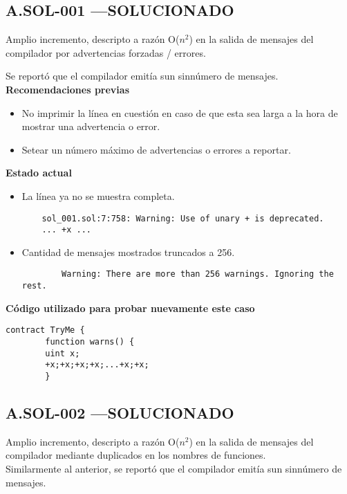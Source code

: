 \subsection*{A.SOL-001 \color{ForestGreen}—SOLUCIONADO}
Amplio incremento, descripto a razón O(${n^2}$) en la salida de mensajes del compilador por advertencias forzadas / errores.
\bigskip

Se reportó que el compilador emitía sun sinnúmero de mensajes.\\

\textbf{Recomendaciones previas}
\begin{itemize}
    \item No imprimir la línea en cuestión en caso de que esta sea larga a la hora de mostrar una advertencia o error.
    \item Setear un número máximo de advertencias o errores a reportar.
\end{itemize}
\bigskip

\textbf{Estado actual}
\begin{itemize}
    \item La línea ya no se muestra completa.
    \begin{lstlisting}
    sol_001.sol:7:758: Warning: Use of unary + is deprecated.
    ... +x ...
    \end{lstlisting}
    \item Cantidad de mensajes mostrados truncados a 256.
    \begin{lstlisting}
        Warning: There are more than 256 warnings. Ignoring the rest.
    \end{lstlisting}
\end{itemize}
\bigskip

\textbf{Código utilizado para probar nuevamente este caso}
\begin{lstlisting}[language=Solidity]
    contract TryMe {
        function warns() {
        uint x;
        +x;+x;+x;+x;...+x;+x;
        }        
\end{lstlisting}


\subsection*{A.SOL-002  \color{ForestGreen}—SOLUCIONADO}
Amplio incremento, descripto a razón O(${n^2}$) en la salida de mensajes del compilador mediante duplicados en los nombres de funciones.\\

Similarmente al anterior, se reportó que el compilador emitía sun sinnúmero de mensajes.\\

